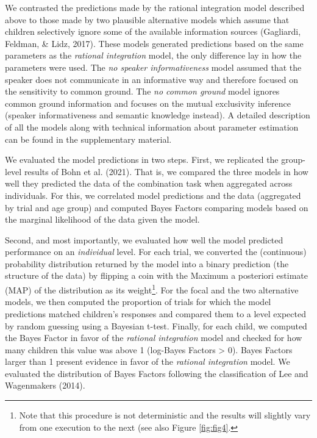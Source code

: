 \documentclass[
  man,mask,floatsintext]{apa6}
\begin{document}
We contrasted the predictions made by the rational integration model described above to those made by two plausible alternative models which assume that children selectively ignore some of the available information sources (Gagliardi, Feldman, \& Lidz, 2017). These models generated predictions based on the same parameters as the \emph{rational integration} model, the only difference lay in how the parameters were used. The \emph{no speaker informativeness} model assumed that the speaker does not communicate in an informative way and therefore focused on the sensitivity to common ground. The \emph{no common ground} model ignores common ground information and focuses on the mutual exclusivity inference (speaker informativeness and semantic knowledge instead). A detailed description of all the models along with technical information about parameter estimation can be found in the supplementary material.

We evaluated the model predictions in two steps. First, we replicated the group-level results of Bohn et al. (2021). That is, we compared the three models in how well they predicted the data of the combination task when aggregated across individuals. For this, we correlated model predictions and the data (aggregated by trial and age group) and computed Bayes Factors comparing models based on the marginal likelihood of the data given the model.

Second, and most importantly, we evaluated how well the model predicted performance on an \emph{individual} level. For each trial, we converted the (continuous) probability distribution returned by the model into a binary prediction (the structure of the data) by flipping a coin with the Maximum a posteriori estimate (MAP) of the distribution as its weight\footnote{Note that this procedure is not deterministic and the results will slightly vary from one execution to the next (see also Figure \ref{fig:fig4}.}. For the focal and the two alternative models, we then computed the proportion of trials for which the model predictions matched children's responses and compared them to a level expected by random guessing using a Bayesian t-test. Finally, for each child, we computed the Bayes Factor in favor of the \emph{rational integration} model and checked for how many children this value was above 1 (log-Bayes Factors \textgreater{} 0). Bayes Factors larger than 1 present evidence in favor of the \emph{rational integration} model. We evaluated the distribution of Bayes Factors following the classification of Lee and Wagenmakers (2014).
\end{document}
